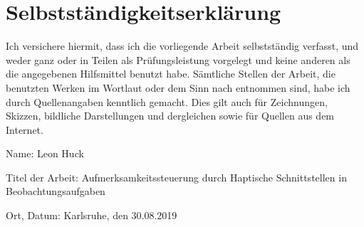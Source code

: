 \documentclass{llncs}					%
\begin{document}
\clearpage
\section{Selbstständigkeitserklärung}

Ich versichere hiermit, dass ich die vorliegende Arbeit selbstständig verfasst, und weder ganz oder in Teilen als Prüfungsleistung vorgelegt und keine anderen als die angegebenen Hilfsmittel benutzt habe. Sämtliche Stellen der Arbeit, die benutzten Werken im Wortlaut oder dem Sinn nach entnommen sind, habe ich durch Quellenangaben kenntlich gemacht. Dies gilt auch für Zeichnungen, Skizzen, bildliche Darstellungen und dergleichen sowie für Quellen aus dem Internet.

Name: Leon Huck

Titel der Arbeit: Aufmerksamkeitssteuerung durch Haptische Schnittstellen in Beobachtungsaufgaben

Ort, Datum: Karlsruhe, den 30.08.2019

\clearpage

\end{document}
